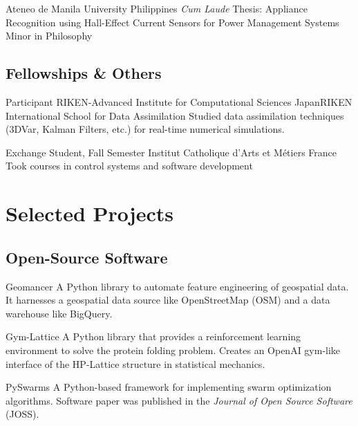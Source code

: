 \documentclass[11pt,a4paper,sans]{moderncv}
\begin{document}
{Ateneo de Manila University}
{Philippines}
{\textit{Cum Laude}}
{
    Thesis: Appliance Recognition using Hall-Effect Current Sensors for
    Power Management Systems\\
    Minor in Philosophy
}


\subsection{Fellowships \& Others}

{Participant}
{RIKEN-Advanced Institute for Computational Sciences}
{Japan}{RIKEN International School for Data Assimilation}
{Studied data assimilation techniques (3DVar, Kalman Filters, etc.) for real-time numerical simulations.}

{Exchange Student, Fall Semester}
{Institut Catholique d'Arts et M\'etiers}
{France}{}
{Took courses in control systems and software development}

\section{Selected Projects}

\subsection{Open-Source Software}


{\color{blue}
    }
{Geomancer}{}{}
{
    A Python library to automate feature engineering of geospatial data. It
    harnesses a geospatial data source like OpenStreetMap (OSM) and a data
    warehouse like BigQuery.
}

{\color{blue} }
{Gym-Lattice}{}{}
{
    A Python library that provides a reinforcement learning environment
    to solve the protein folding problem. Creates an OpenAI gym-like
    interface of the HP-Lattice structure in statistical mechanics.
}

{\color{blue} }
{PySwarms}{}{}
{
    A Python-based framework for implementing swarm optimization
    algorithms. Software paper was published in the \textit{Journal of Open
        Source Software} (JOSS).
}
\end{document}
